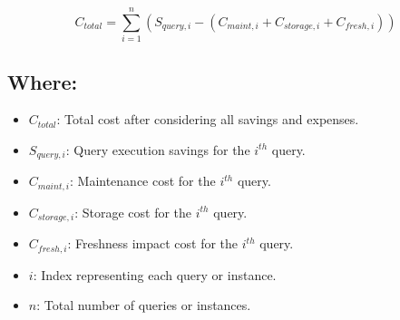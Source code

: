 

\begin{equation}
C_{total} = \sum_{i=1}^{n} \left( S_{query,i} - (C_{maint,i} + C_{storage,i} + C_{fresh,i}) \right)
\end{equation}

\subsection*{Where:}
\begin{itemize}
    \item $C_{total}$: Total cost after considering all savings and expenses.
    \item $S_{query,i}$: Query execution savings for the $i^{th}$ query.
    \item $C_{maint,i}$: Maintenance cost for the $i^{th}$ query.
    \item $C_{storage,i}$: Storage cost for the $i^{th}$ query.
    \item $C_{fresh,i}$: Freshness impact cost for the $i^{th}$ query.
    \item $i$: Index representing each query or instance.
    \item $n$: Total number of queries or instances.
\end{itemize}

